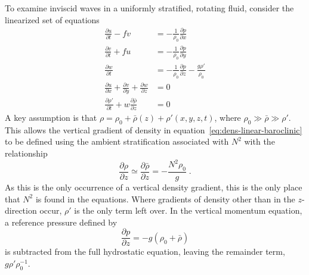 \documentclass[11pt]{report}
\numberwithin{equation}{section}
\begin{document}
To examine inviscid waves in a uniformly stratified, rotating fluid, consider the linearized set of equations
\begin{align}
    \frac{\partial u}{\partial t} - fv 
        &= -\frac{1}{\rho_0}\frac{\partial p}{\partial x} \label{eq:u-linear-baroclinic} \\
    \frac{\partial v}{\partial t} + fu 
        &= -\frac{1}{\rho_0}\frac{\partial p}{\partial y} \label{eq:v-linear-baroclinic} \\
    \frac{\partial w}{\partial t}  
                &= -\frac{1}{\rho_0}\frac{\partial p}{\partial z} 
                   -\frac{g \rho'}{\rho_0} \label{eq:w-linear-baroclinic} \\
    \frac{\partial u}{\partial x} 
        + \frac{\partial v}{\partial y} 
        + \frac{\partial w}{\partial z} 
                &= 0 \label{eq:cont-linear-baroclinic}\\
    \frac{\partial \rho'}{\partial t} + w\frac{\partial \bar{\rho}}{\partial z}
                &= 0 \label{eq:dens-linear-baroclinic}
\end{align}
A key assumption is that $\rho = \rho_0 + \bar{\rho}(z) + \rho'(x, y, z, t)$, where $\rho_0 \gg \bar{\rho} \gg \rho'$.  This allows the vertical gradient of density in equation~\ref{eq:dens-linear-baroclinic} to be defined using the ambient stratification associated with $N^2$ with the relationship
\begin{equation}
    \frac{\partial \rho}{\partial z} \simeq \frac{\partial \bar{\rho}}{\partial z} = -\frac{N^2 \rho_0}{g} \; .
\end{equation}
As this is the only occurrence of a vertical density gradient, this is the only place that $N^2$ is found in the equations.  Where gradients of density other than in the $z$-direction occur, $\rho'$ is the only term left over.  In the vertical momentum equation, a reference pressure defined by
\begin{equation}
    \frac{\partial p}{\partial z} = -g (\rho_0 + \bar{\rho})
\end{equation}
is subtracted from the full hydrostatic equation, leaving the remainder term, $g \rho' \rho_0^{-1}$.
\end{document}
